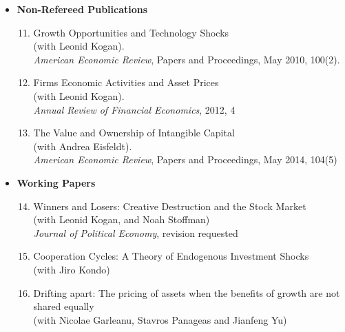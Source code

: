 \documentclass[11pt,letterpaper,serif,overlapped]{res}
\begin{document}
\begin{resume}
\begin{itemize}
\vspace{0.5cm}
\item \textbf{Non-Refereed Publications}
\begin{enumerate}
\setcounter{enumi}{10}
\item Growth Opportunities and Technology Shocks\\ (with Leonid Kogan). \\
\emph{American Economic Review}, Papers and Proceedings, May 2010, 100(2).
\item Firms Economic Activities and Asset Prices\\ (with Leonid Kogan). \\
\emph{Annual Review of Financial Economics}, 2012, 4
\item The Value and Ownership of Intangible Capital\\ (with Andrea Eisfeldt). \\
\emph{American Economic Review}, Papers and Proceedings, May 2014, 104(5)
\end{enumerate}

\vspace{0.5cm}
\item \textbf{Working Papers}
\begin{enumerate}
\setcounter{enumi}{13}
\item Winners and Losers: Creative Destruction and the Stock Market\\ (with Leonid Kogan, and Noah Stoffman)\\\emph{Journal of Political Economy}, revision requested
\item Cooperation Cycles: A Theory of Endogenous Investment Shocks\\ (with Jiro Kondo)

\item Drifting apart: The pricing of assets when the benefits of growth are not shared equally\\ (with Nicolae Garleanu, Stavros Panageas and Jianfeng Yu)
\end{enumerate}

%


\end{itemize}
\end{resume}
\end{document}
